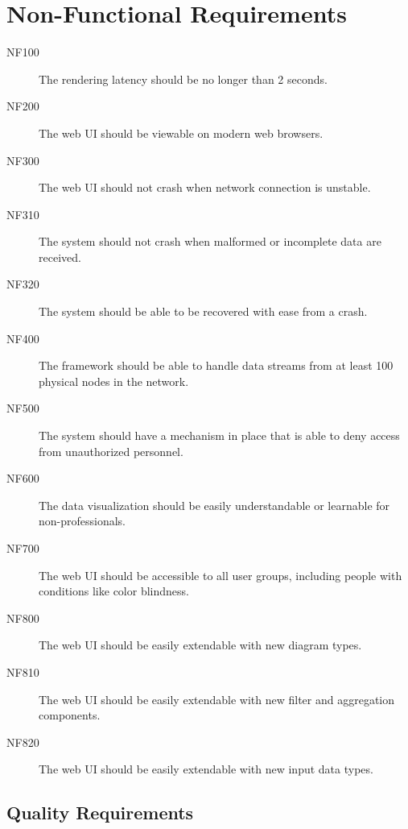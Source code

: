 \documentclass[twoside, english, draft]{Pflichtenheft}
\begin{document}
\section{Non-Functional Requirements}

\begin{description}

	\item[NF100]
	      The rendering latency should be no longer than 2 seconds.

	\item[NF200]
	      The web UI should be viewable on modern web browsers.

	\item[NF300]
	      The web UI should not crash when network connection is unstable.

	\item[NF310]
	      The system should not crash when malformed or incomplete data are received.
	\item[NF320]
	      The system should be able to be recovered with ease from a crash.

	\item[NF400]
	      The framework should be able to handle \glspl{data stream} from at least 100 physical nodes in the network.

	\item[NF500]
	      The system should have a mechanism in place that is able to deny access from unauthorized personnel.

	\item[NF600]
	      The data visualization should be easily understandable or learnable for non-professionals.

	\item[NF700]
	      The web UI should be accessible to all user groups, including people with conditions like color blindness.

	\item[NF800]
	      The web UI should be easily extendable with new diagram types.

	\item[NF810]
	      The web UI should be easily extendable with new filter and aggregation components.

	\item[NF820]
	      The web UI should be easily extendable with new input data types.

\end{description}
\subsection{Quality Requirements}
\end{document}
